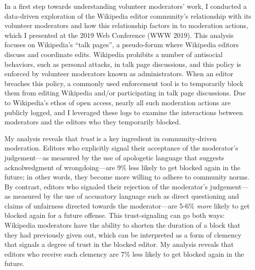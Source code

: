 \documentclass[11pt,letterpaper]{article}
\begin{document}
In a first step towards understanding volunteer moderators' work, I conducted a data-driven exploration of the Wikipedia editor community's relationship with its volunteer moderators and how this relationship factors in to moderation actions, which I presented at the 2019 Web Conference (WWW 2019).
This analysis focuses on Wikipedia's ``talk pages'', a pseudo-forum where Wikipedia editors discuss and coordinate edits.
Wikipedia prohibits a number of antisocial behaviors, such as personal attacks, in talk page discussions, and this policy is enforced by volunteer moderators known as administrators.
When an editor breaches this policy, a commonly used enforcement tool is to temporarily block them from editing Wikipedia and/or participating in talk page discussions.
Due to Wikipedia's ethos of open access, nearly all such moderation actions are publicly logged, and I leveraged these logs to examine the interactions between moderators and the editors who they temporarily blocked.

My analysis reveals that \emph{trust} is a key ingredient in community-driven moderation.
Editors who explicitly signal their acceptance of the moderator's judgement---as measured by the use of apologetic language that suggests acknolwedgment of wrongdoing---are 9\% less likely to get blocked again in the future; in other words, they become more willing to adhere to community norms.
By contrast, editors who signaled their rejection of the moderator's judgement---as measured by the use of accusatory language such as direct questioning and claims of unfairness directed towards the moderator---are 5-6\% \emph{more} likely to get blocked again for a future offense.
This trust-signaling can go both ways: Wikipedia moderators have the ability to shorten the duration of a block that they had previously given out, which can be interpreted as a form of clemency that signals a degree of trust in the blocked editor.
My analysis reveals that editors who receive such clemency are 7\% less likely to get blocked again in the future.

\end{document}
